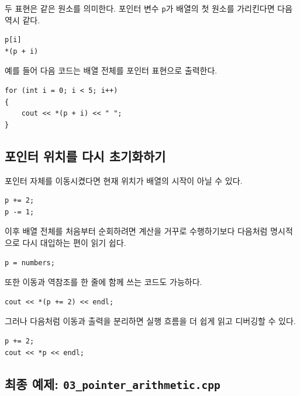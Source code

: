 \documentclass[11pt,a4paper]{article}
\begin{document}
두 표현은 같은 원소를 의미한다. 포인터 변수 \texttt{p}가 배열의 첫 원소를 가리킨다면 다음 역시 같다.

\begin{lstlisting}
p[i]
*(p + i)
\end{lstlisting}

예를 들어 다음 코드는 배열 전체를 포인터 표현으로 출력한다.

\begin{lstlisting}
for (int i = 0; i < 5; i++)
{
    cout << *(p + i) << " ";
}
\end{lstlisting}

\subsection{포인터 위치를 다시 초기화하기}

포인터 자체를 이동시켰다면 현재 위치가 배열의 시작이 아닐 수 있다.

\begin{lstlisting}
p += 2;
p -= 1;
\end{lstlisting}

이후 배열 전체를 처음부터 순회하려면 계산을 거꾸로 수행하기보다 다음처럼 명시적으로 다시 대입하는 편이 읽기 쉽다.

\begin{lstlisting}
p = numbers;
\end{lstlisting}

또한 이동과 역참조를 한 줄에 함께 쓰는 코드도 가능하다.

\begin{lstlisting}
cout << *(p += 2) << endl;
\end{lstlisting}

그러나 다음처럼 이동과 출력을 분리하면 실행 흐름을 더 쉽게 읽고 디버깅할 수 있다.

\begin{lstlisting}
p += 2;
cout << *p << endl;
\end{lstlisting}

\subsection{최종 예제: \texttt{03\_pointer\_arithmetic.cpp}}
\end{document}
